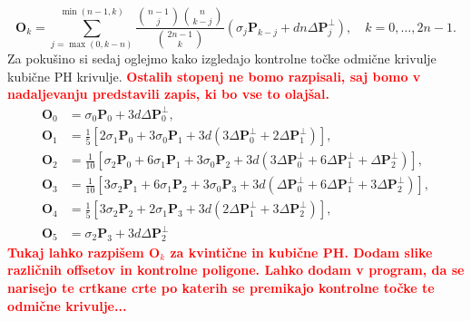 \documentclass[isrm2, tisk]{fmfdelo}
\newcommand{\mycomment}[1]{\textbf{\textcolor{red}{#1}}}
\begin{document}
    \[\mathbf{O}_k= \sum_{j=\max(0,k-n)}^{\min(n-1,k)} \frac{\binom{n-1}{j}\binom{n}{k-j} }{\binom{2n-1}{k}}(\sigma_j\mathbf{P}_{k-j} + dn\Delta \mathbf{P}_j^{\perp}),\quad k=0,\ldots,2n-1.        \]
    Za pokušino si sedaj oglejmo kako izgledajo kontrolne točke odmične krivulje kubične PH krivulje.
    \mycomment{Ostalih stopenj ne bomo razpisali, saj bomo v nadaljevanju predstavili zapis, ki bo vse to olajšal.}
    \begin{align*}
        \mathbf{O}_0 &= \sigma_0\mathbf{P}_0+3d\Delta\mathbf{P}_0^{\perp},  \\
        \mathbf{O}_1 &= \frac{1}{5} \left[ 2\sigma_1\mathbf{P}_0+ 3\sigma_0\mathbf{P}_1 + 3d(3\Delta\mathbf{P}_0^{\perp} + 2\Delta\mathbf{P}_1^{\perp})\right], \\
        \mathbf{O}_2 &= \frac{1}{10} \left[\sigma_2\mathbf{P}_0+ 6\sigma_1\mathbf{P}_1 + 3\sigma_0\mathbf{P}_2 + 3d(3\Delta\mathbf{P}_0^{\perp} + 6\Delta\mathbf{P}_1^{\perp}+\Delta\mathbf{P}_2^{\perp})\right], \\
        \mathbf{O}_3 &= \frac{1}{10} \left[3\sigma_2\mathbf{P}_1+ 6\sigma_1\mathbf{P}_2 + 3\sigma_0\mathbf{P}_3 + 3d(\Delta\mathbf{P}_0^{\perp} + 6\Delta\mathbf{P}_1^{\perp}+3\Delta\mathbf{P}_2^{\perp})\right], \\
        \mathbf{O}_4 &= \frac{1}{5} \left[3\sigma_2\mathbf{P}_2+ 2\sigma_1\mathbf{P}_3 + 3d(2\Delta\mathbf{P}_1^{\perp} + 3\Delta\mathbf{P}_2^{\perp})\right], \\
        \mathbf{O}_5 &= \sigma_2\mathbf{P}_3+3d\Delta\mathbf{P}_2^{\perp}
    \end{align*}
    \mycomment{Tukaj lahko razpišem $\mathbf{O}_k$ za kvintične in kubične PH.
    Dodam slike različnih offsetov in kontrolne poligone.
    Lahko dodam v program, da se narisejo te crtkane crte po katerih se premikajo kontrolne točke te odmične krivulje...}
\end{document}
